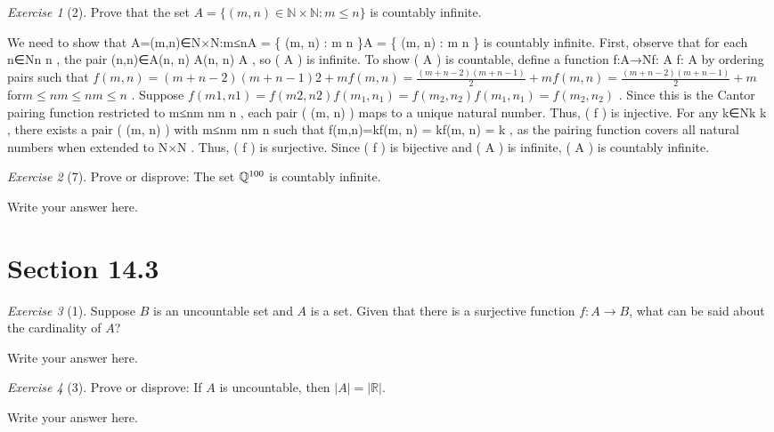 \documentclass[12pt]{amsart}
\makeatletter
\theoremstyle{remark}
\newtheorem*{exercise}{Exercise}%
\def\RR{\ensuremath{\mathbb R}}
\def\NN{\ensuremath{\mathbb N}}
\def\QQ{{\ensuremath\mathbb Q}}
\renewenvironment{proof}[1][\proofname]{\par\doublespacing
  \pushQED{\qed}%
  \normalfont \topsep6\p@\@plus6\p@\relax
  \list{}{%
    \settowidth{\leftmargin}{\itshape\proofname:\hskip\labelsep}%
    \setlength{\labelwidth}{0pt}%
    \setlength{\itemindent}{-\leftmargin}%
  }%
  \item[\hskip\labelsep\itshape#1\@addpunct{:}]\ignorespaces
}{%
  \popQED\endlist\@endpefalse
  \singlespacing
}
\theoremstyle{mycomment}
\makeatother
\begin{document}
\begin{exercise}[2] Prove that the set $A=\{(m,n)\in\NN\times\NN:m\le n\}$ is countably infinite.
\begin{proof}
We need to show that A={(m,n)∈N×N:m≤n}A = \{ (m, n) \in {} \times {} : m \leq n \}A = \{ (m, n) \in {} \times {} : m \leq n \}
 is countably infinite. First, observe that for each n∈Nn \in {}n \in {}
, the pair (n,n)∈A(n, n) \in A(n, n) \in A
, so ( A ) is infinite. To show ( A ) is countable, define a function f:A→Nf: A \to {}f: A \to {}
 by ordering pairs such that $f(m,n)=(m+n−2)(m+n−1)2+mf(m, n) = \frac{(m + n - 2)(m + n - 1)}{2} + mf(m, n) = \frac{(m + n - 2)(m + n - 1)}{2} + m$
 for$ m≤nm \leq nm \leq n$
. Suppose $f(m1,n1)=f(m2,n2)f(m_1, n_1) = f(m_2, n_2)f(m_1, n_1) = f(m_2, n_2)$
. Since this is the Cantor pairing function restricted to m≤nm \leq nm \leq n
, each pair ( (m, n) ) maps to a unique natural number. Thus, ( f ) is injective. For any k∈Nk \in {}k \in {}
, there exists a pair ( (m, n) ) with m≤nm \leq nm \leq n
 such that f(m,n)=kf(m, n) = kf(m, n) = k
, as the pairing function covers all natural numbers when extended to N×N \times {} \times {}
. Thus, ( f ) is surjective. Since ( f ) is bijective and ( A ) is infinite, ( A ) is countably infinite.


\end{proof}
\end{exercise}

\begin{exercise}[7] Prove or disprove: The set $\QQ^{100}$ is countably infinite.
\begin{proof}
Write your answer here.
\end{proof}
\end{exercise}

\section*{Section 14.3}
\begin{exercise}[1] Suppose $B$ is an uncountable set and $A$ is a set. Given that there is a surjective function $f:A\to B$, what can be said about the cardinality of $A$?
\begin{proof}[Solution]
Write your answer here.
\end{proof}
\end{exercise}


\begin{exercise}[3] Prove or disprove: If $A$ is uncountable, then $|A|=|\RR|$.
\begin{proof}
Write your answer here.
\end{proof}
\end{exercise}
\end{document}
